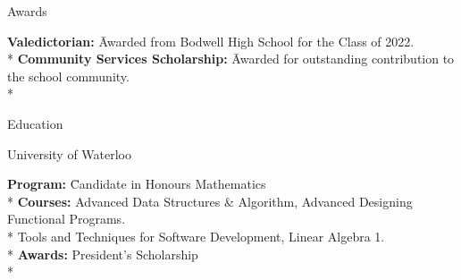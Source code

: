 \documentclass{article}
\newlength{\tabin}
\newlength{\secsep}
\newcommand{\lineunder}{\vspace*{-8pt} \\ \hspace*{-6pt} \hrulefill \\ \vspace*{-15pt}}
\newenvironment{tabbedsection}[1]{
  \begin{list}{}{
      \setlength{\itemsep}{0pt}
      \setlength{\labelsep}{0pt}
      \setlength{\labelwidth}{0pt}
      \setlength{\leftmargin}{\tabin}
      \setlength{\rightmargin}{\tabin}
      \setlength{\listparindent}{0pt}
      \setlength{\parsep}{0pt}
      \setlength{\parskip}{0pt}
      \setlength{\partopsep}{0pt}
      \setlength{\topsep}{#1}
    }
  \item[]
}{\end{list}}
\newenvironment{nospacetabbing}{
    \begin{tabbing}
}{\end{tabbing}\vspace{-1.2em}}
\newenvironment{resume_section}[1]{
  \filbreak
  \vspace{2\secsep}
  \textsc{\large#1}
  \lineunder
  \begin{tabbedsection}{\secsep}
}{\end{tabbedsection}}
\newenvironment{resume_subsection}[2][]{
  \textbf{#2} \hfill {\footnotesize #1} \hspace{-5.1em}
  \begin{tabbedsection}{0.5\secsep}
}{\end{tabbedsection}}
\begin{document}
\begin{resume_section}{Awards}
  \begin{nospacetabbing}
    \textbf{Valedictorian:} \= Awarded from Bodwell High School for the Class of 2022.\\*
    \textbf{Community Services Scholarship:} \= Awarded for outstanding contribution to the school community.\\*
  \end{nospacetabbing}
\end{resume_section}

\begin{resume_section}{Education}
  \begin{resume_subsection}[07/2022 - Present]{University of Waterloo}
    \begin{nospacetabbing}
      \textbf{Program:} \= Candidate in Honours Mathematics \\*
      \textbf{Courses:} \>Advanced Data Structures \& Algorithm, Advanced Designing Functional Programs.
                        \\*\> Tools and Techniques for Software Development, Linear Algebra 1.\\*
      \textbf{Awards:} \> President's Scholarship\\*
    \end{nospacetabbing}
  \end{resume_subsection}
\end{resume_section}



  
\end{document}
